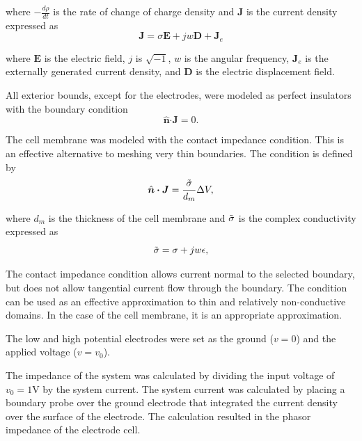 where $-\frac{d\rho}{dt}$ is the rate of change of charge density and $\boldsymbol J$ is the current density expressed as
\begin{equation}
    \boldsymbol J = \sigma\boldsymbol E + jw\boldsymbol D + \boldsymbol J_e
\end{equation}

where $\boldsymbol E$ is the electric field, $j$ is $\sqrt{-1}$, $w$ is the angular frequency, $\boldsymbol J_e$ is the externally generated current density, and $\boldsymbol D$ is the electric displacement field. 

\par All exterior bounds, except for the electrodes, were modeled as perfect insulators with the boundary condition
\begin{equation}
    \hat{\boldsymbol n} \boldsymbol\cdot \boldsymbol J = 0.
\end{equation}

\par The cell membrane was modeled with the contact impedance condition. This is an effective alternative to meshing very thin boundaries. The condition is defined by
\begin{equation}
    \hat{\boldsymbol n} \boldsymbol\cdot \boldsymbol J = \frac{\Tilde{\sigma}}{d_{m}} \Delta V,
\end{equation}

where $d_m$ is the thickness of the cell membrane and $\Tilde{\sigma}$ is the complex conductivity expressed as
\begin{equation}
    \Tilde{\sigma} = \sigma + jw\epsilon ,
\end{equation}

\par The contact impedance condition allows current normal to the selected boundary, but does not allow tangential current flow through the boundary. The condition can be used as an effective approximation to thin and relatively non-conductive domains. In the case of the cell membrane, it is an appropriate approximation. 

\par The low and high potential electrodes were set as the ground ($v=0$) and the applied voltage ($v=v_0$).

\par The impedance of the system was calculated by dividing the input voltage of $v_0 = 1$V by the system current. The system current was calculated by placing a boundary probe over the ground electrode that integrated the current density over the surface of the electrode. The calculation resulted in the phasor impedance of the electrode cell. 

